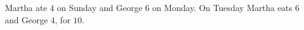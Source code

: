 Martha ate $4$ on Sunday and George $6$ on Monday. On Tuesday Martha eats $6$ and George $4$, for $\boxed{10}$.
